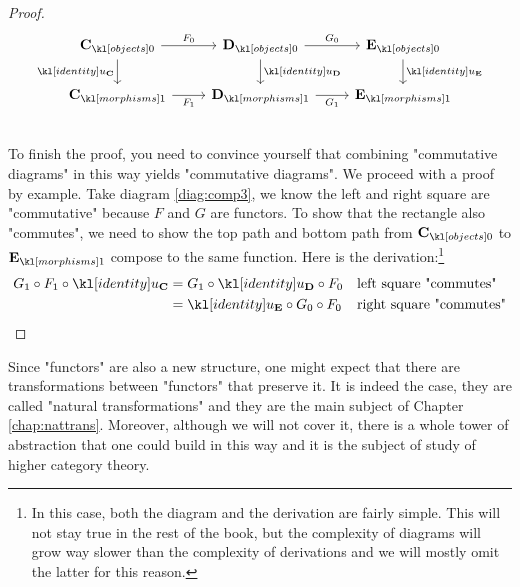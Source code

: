 \documentclass[main.tex]{subfiles}
\begin{document}
\begin{proof}
\begin{minipage}{0.49\textwidth}
\begin{equation}
				\begin{tikzcd}
					\obj{\mathbf{C}} \arrow[r, "F_0"] \arrow[d, "\idu_{\mathbf{C}}"'] & \obj{\mathbf{D}} \arrow[r, "G_0"] \arrow[d, "\idu_{\mathbf{D}}"] & \obj{\mathbf{E}} \arrow[d, "\idu_{\mathbf{E}}"] \\
					\mor{\mathbf{C}} \arrow[r, "F_1"']                  & \mor{\mathbf{D}} \arrow[r, "G_1"']                 & \mor{\mathbf{E}}                 
				\end{tikzcd}
		\end{equation}
	\end{minipage}\\
	To finish the proof, you need to convince yourself that combining "commutative diagrams" in this way yields "commutative diagrams". We proceed with a proof by example. Take diagram \eqref{diag:comp3}, we know the left and right square are "commutative" because $F$ and $G$ are functors. To show that the rectangle also "commutes", we need to show the top path and bottom path from $\obj{\mathbf{C}}$ to $\mor{\mathbf{E}}$ compose to the same function. Here is the derivation:\footnote{In this case, both the diagram and the derivation are fairly simple. This will not stay true in the rest of the book, but the complexity of diagrams will grow way slower than the complexity of derivations and we will mostly omit the latter for this reason.}
	\begin{align*}
		G_1 \circ F_1 \circ \idu_{\mathbf{C}} &= G_1 \circ \idu_{\mathbf{D}} \circ F_0 &&\text{left square "commutes"}\\
		&= \idu_{\mathbf{E}} \circ G_0 \circ F_0&&\text{right square "commutes"}
	\end{align*}
\end{proof}
Since "functors" are also a new structure, one might expect that there are transformations between "functors" that preserve it. It is indeed the case, they are called "natural transformations" and they are the main subject of Chapter \ref{chap:nattrans}. Moreover, although we will not cover it, there is a whole tower of abstraction that one could build in this way and it is the subject of study of higher category theory.
\end{document}
